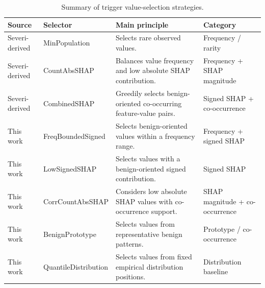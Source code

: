\begin{table}[!t]
    \centering
    \caption{Summary of trigger value-selection strategies.}
    \label{tab:value_selectors}
    \begin{tabularx}{\textwidth}{>{\raggedright\arraybackslash}p{2.2cm}
    >{\raggedright\arraybackslash}p{3.2cm}
    >{\raggedright\arraybackslash}X
    >{\raggedright\arraybackslash}p{3.2cm}}
        \toprule
        \textbf{Source} & \textbf{Selector} & \textbf{Main principle} & \textbf{Category} \\
        \midrule
        Severi-derived & MinPopulation & Selects rare observed values. & Frequency / rarity \\
        Severi-derived & CountAbsSHAP & Balances value frequency and low absolute SHAP contribution. & Frequency + SHAP magnitude \\
        Severi-derived & CombinedSHAP & Greedily selects benign-oriented co-occurring feature-value pairs. & Signed SHAP + co-occurrence \\
        This work & FreqBoundedSigned & Selects benign-oriented values within a frequency range. & Frequency + signed SHAP \\
        This work & LowSignedSHAP & Selects values with a benign-oriented signed contribution. & Signed SHAP \\
        This work & CorrCountAbsSHAP & Considers low absolute SHAP values with co-occurrence support. & SHAP magnitude + co-occurrence \\
        This work & BenignPrototype & Selects values from representative benign patterns. & Prototype / co-occurrence \\
        This work & QuantileDistribution & Selects values from fixed empirical distribution positions. & Distribution baseline \\
        \bottomrule
    \end{tabularx}
\end{table}